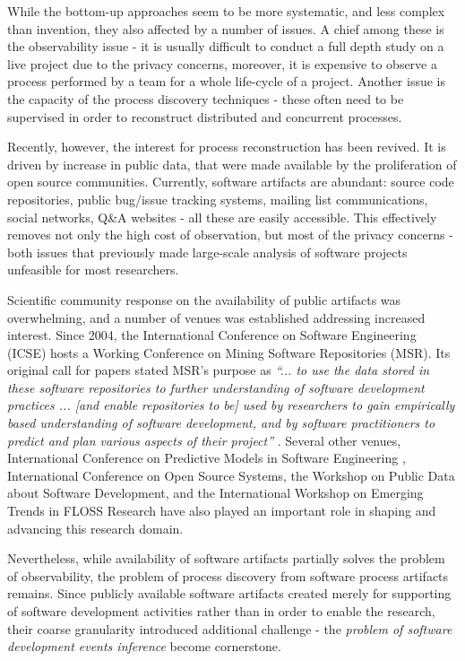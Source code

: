 While the bottom-up approaches seem to be more systematic, and less complex than invention, they 
also affected by a number of issues. A chief among these is the observability issue - 
it is usually difficult to conduct a full depth study on a live project due to the privacy concerns, 
moreover, it is expensive to observe a process performed by a team for a whole life-cycle of a project. 
Another issue is the capacity of the process discovery techniques - these often need to be supervised 
in order to reconstruct distributed and concurrent processes. 

Recently, however, the interest for process reconstruction has been revived. 
It is driven by increase in public data, that were made available by the proliferation of open source communities.
Currently, software artifacts are abundant: source code repositories, public bug/issue tracking systems, 
mailing list communications, social networks, Q\&A websites - all these are easily accessible. 
This effectively removes not only the high cost of observation, but most of the privacy concerns - both 
issues that previously made large-scale analysis of software projects unfeasible for most researchers.

Scientific community response on the availability of public artifacts was overwhelming, and a number of 
venues was established addressing increased interest. 
Since 2004, the International Conference on Software Engineering (ICSE) hosts a Working Conference on 
Mining Software Repositories (MSR). Its original call for papers stated MSR's purpose as 
\textit{``... to use the data stored in these software repositories to further understanding of software 
development practices ... [and enable repositories to be] used by researchers to gain empirically based 
understanding of software development, and by software practitioners to predict and plan various aspects 
of their project''} \cite{msr2004} \cite{citeulike:7853299}. 
Several other venues, International Conference on Predictive Models in Software Engineering \cite{promise12}, 
International Conference on Open Source Systems, the Workshop on Public Data about Software Development, 
and the International Workshop on Emerging Trends in FLOSS Research have also played
an important role in shaping and advancing this research domain.

Nevertheless, while availability of software artifacts partially solves the problem of observability, 
the problem of process discovery from software process artifacts remains. 
Since publicly available software artifacts created merely for supporting of software development 
activities rather than in order to enable the research, their coarse granularity introduced additional 
challenge - the \textit{problem of software development events inference} become cornerstone. 

